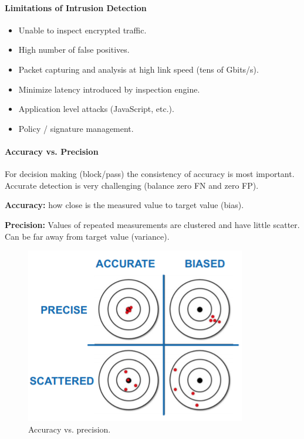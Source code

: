 \paragraph{Limitations of Intrusion Detection}
\begin{itemize}
    \item Unable to inspect encrypted traffic.
    \item High number of false positives.
    \item Packet capturing and analysis at high link speed (tens of Gbits/s).
    \item Minimize latency introduced by inspection engine.
    \item Application level attacks (JavaScript, etc.).
    \item Policy / signature management.
\end{itemize}

\paragraph{Accuracy vs. Precision}
For decision making (block/pass) the consistency of accuracy is most important. Accurate detection is very challenging (balance zero FN and zero FP). 


\textbf{Accuracy:} how close is the measured value to target value (bias).

\textbf{Precision:} Values of repeated measurements are clustered and have little scatter. Can be far away from target value (variance).

\begin{figure}[h]
	\centering
	\includegraphics[scale=0.6]{images/911-accprec.PNG}
	\caption{Accuracy vs. precision.}
	\label{fig:accprec}
\end{figure}


